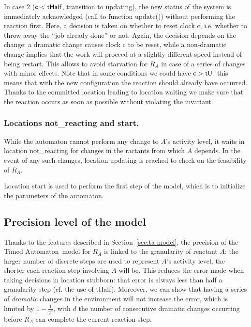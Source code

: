 \documentclass{llncs}
\newcommand{\ta}{Timed Automaton}
\begin{document}
In case 2 (${\sf c} < {\sf tHalf}$, transition to {\sf updating}), the new status of the system is
immediately acknowledged (call to function {\sf update()}) without
performing the reaction first. Here, a decision is taken on whether to reset clock {\sf c}, i.e. whether to
throw away the ``job already done'' or not. Again, the decision depends on the change: a dramatic change causes
clock {\sf c} to be reset, while a non-dramatic change implies that the work will proceed at a slightly different
speed instead of being restart. This allows to avoid starvation for $R_A$ in case of a series of changes
with minor effects. Note that in some conditions we could have
${\sf c} > {\sf tU}$: this means that with the new configuration the reaction should already have occurred. Thanks
to the committed location leading to location {\sf waiting} we make sure that the reaction occurs as soon as possible
without violating the invariant.

\subsubsection{Locations {\sf not\_reacting} and {\sf start}.} While the automaton cannot perform any change
to $A$'s activity level, it waits in location {\sf not\_reacting} for changes in the ractants from which $A$
depends. In the event of any such changes, location {\sf updating} is reached to check on the feasibility of $R_A$.

Location {\sf start} is used to perform the first step of the model, which is to initialize the parameters of the automaton.

\subsection{Precision level of the model}\label{sec:ta-precision}
Thanks to the features described in Section~\ref{sec:ta-model}, the precision of the \ta\ model for $R_A$ 
is linked to the granularity of reactant $A$: the larger number of discrete steps are used to represent $A$'s
activity level, the shorter each reaction step involving $A$ will be. This reduces the error made when taking decisions
in location {\sf stubborn}: that error is always less than half a granularity step (cf. the use of {\sf tHalf}).
Moreover, we can show that having a series of \emph{dramatic} changes in the environment will not
increase the error, which is limited by $1 - \frac{1}{2^d}$, with $d$ the number of consecutive dramatic changes
occurring before $R_A$ can complete the current reaction step.
\end{document}
